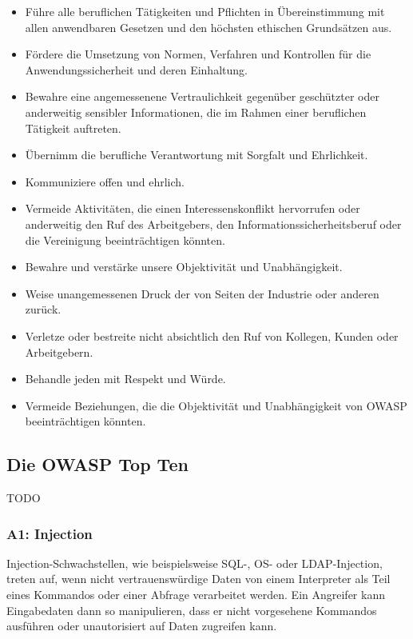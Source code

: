 \documentclass[12pt,oneside,a4paper,parskip]{scrbook}
\begin{document}
  \begin{itemize}
    \item Führe alle beruflichen Tätigkeiten und Pflichten in Übereinstimmung mit allen anwendbaren Gesetzen und den höchsten ethischen Grundsätzen aus.
    \item Fördere die Umsetzung von Normen, Verfahren und Kontrollen für die Anwendungssicherheit und deren Einhaltung.
    \item Bewahre eine angemessenene Vertraulichkeit gegenüber geschützter oder anderweitig sensibler Informationen, die im Rahmen einer beruflichen Tätigkeit auftreten.
    \item Übernimm die berufliche Verantwortung mit Sorgfalt und Ehrlichkeit.
    \item Kommuniziere offen und ehrlich.
    \item Vermeide Aktivitäten, die einen Interessenskonflikt hervorrufen oder anderweitig den Ruf des Arbeitgebers, den Informationssicherheitsberuf oder die Vereinigung beeinträchtigen könnten.
    \item Bewahre und verstärke unsere Objektivität und Unabhängigkeit.
    \item Weise unangemessenen Druck der von Seiten der Industrie oder anderen zurück.
    \item Verletze oder bestreite nicht absichtlich den Ruf von Kollegen, Kunden oder Arbeitgebern.
    \item Behandle jeden mit Respekt und Würde.
    \item Vermeide Beziehungen, die die Objektivität und Unabhängigkeit von OWASP  beeinträchtigen könnten.
  \end{itemize}
    \subsection{Die OWASP Top Ten}
    TODO
     \cite{OWASPtop10}

    \subsubsection{A1: Injection}
    Injection-Schwachstellen, wie beispielsweise SQL-, OS- oder LDAP-Injection, treten auf, wenn
    nicht vertrauenswürdige Daten von einem Interpreter als Teil eines Kommandos oder einer
    Abfrage verarbeitet werden. Ein Angreifer kann Eingabedaten dann so manipulieren, dass er nicht
    vorgesehene Kommandos ausführen oder unautorisiert auf Daten zugreifen kann.
\end{document}
